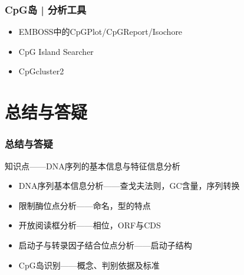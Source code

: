 \begin{frame}
  \frametitle{CpG岛 | 分析工具}
  \begin{itemize}
    \item EMBOSS中的CpGPlot/CpGReport/Isochore
    \item CpG Island Searcher
    \item CpGcluster2
  \end{itemize}
\end{frame}

\section{总结与答疑}
\begin{frame}
  \frametitle{总结与答疑}
  \begin{block}{知识点——DNA序列的基本信息与特征信息分析}
    \begin{itemize}
      \item DNA序列基本信息分析——查戈夫法则，GC含量，序列转换
      \item 限制酶位点分析——命名，型的特点
      \item 开放阅读框分析——相位，ORF与CDS
      \item 启动子与转录因子结合位点分析——启动子结构
      \item CpG岛识别——概念、判别依据及标准
    \end{itemize}
  \end{block}
\end{frame}
